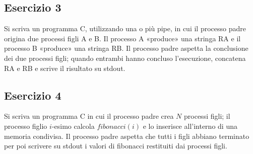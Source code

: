 \documentclass{article}
\begin{document}
\subsection*{Esercizio 3}
Si scriva un programma C, utilizzando una o più pipe, in cui il processo padre origina due processi figli A e B. Il processo A «produce» una stringa RA e il processo B «produce» una stringa RB. Il processo padre aspetta la conclusione dei due processi figli; quando entrambi hanno concluso l’esecuzione, concatena RA e RB e scrive il risultato su stdout. 

\subsection*{Esercizio 4}
Si scriva un programma C in cui il processo padre crea $N$ processi figli; il processo figlio $i$-esimo calcola $fibonacci(i)$ e lo inserisce all'interno di una memoria condivisa. Il processo padre aspetta che tutti i figli abbiano terminato per poi scrivere su stdout i valori di fibonacci restituiti dai processi figli.
\end{document}
